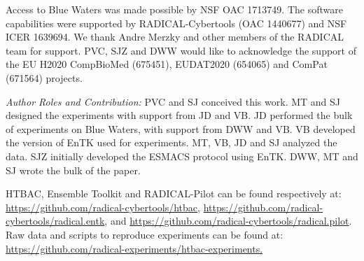 
\footnotesize

Access to Blue Waters was made possible by NSF OAC 1713749. The software
capabilities were supported by RADICAL-Cybertools (OAC 1440677) and NSF ICER
1639694. We thank Andre Merzky and other members of the RADICAL team for
support. PVC, SJZ and DWW would like to acknowledge the support of the EU
H2020 CompBioMed (675451), EUDAT2020 (654065) and ComPat (671564) projects.

{\it Author Roles and Contribution:} PVC and SJ conceived this work. MT and SJ
designed the experiments with support from JD and VB. JD performed the bulk of
experiments on Blue Waters, with support from DWW and VB. VB developed the
version of EnTK used for experiments. MT, VB, JD and SJ analyzed the data. SJZ
initially developed the ESMACS protocol using EnTK. DWW, MT and SJ wrote the
bulk of the paper.

HTBAC, Ensemble Toolkit and
RADICAL-Pilot can be found respectively at:
\url{https://github.com/radical-cybertools/htbac},
\url{https://github.com/radical-cybertools/radical.entk}, and
\url{https://github.com/radical-cybertools/radical.pilot}. Raw data and
scripts to reproduce experiments can be found at:
\url{https://github.com/radical-experiments/htbac-experiments.}








